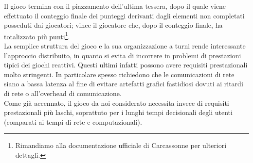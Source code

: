 Il gioco termina con il piazzamento dell'ultima tessera, dopo il quale viene effettuato il conteggio finale dei punteggi derivanti dagli elementi non completati posseduti dai giocatori; vince il giocatore che, dopo il conteggio finale, ha totalizzato più punti\footnote{Rimandiamo alla documentazione ufficiale di Carcassonne per ulteriori dettagli.}. \\

La semplice struttura del gioco e la sua organizzazione a turni rende
interessante l'approccio distribuito, in quanto si evita di incorrere in problemi 
di prestazioni tipici dei giochi reattivi. Questi ultimi infatti possono avere requisiti prestazionali molto stringenti. In
particolare spesso richiedono che le comunicazioni di rete siano a bassa
latenza al fine di evitare
artefatti grafici fastidiosi dovuti ai ritardi di rete o all'overhead di
comunicazione.\\
Come già accennato, il gioco da noi considerato necessita invece di
requisiti prestazionali più laschi, soprattuto per i lunghi tempi
decisionali degli utenti (comparati ai tempi di rete e computazionali).\\
